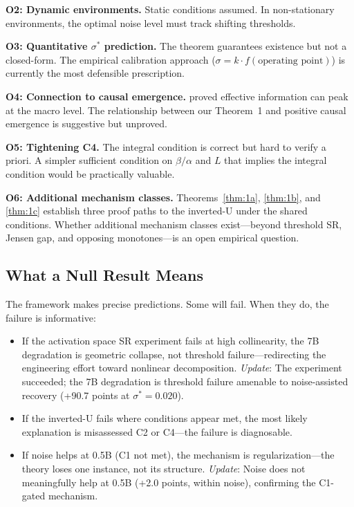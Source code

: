 \documentclass[12pt,letterpaper]{article}
\theoremstyle{definition}
\theoremstyle{remark}
\begin{document}
\textbf{O2: Dynamic environments.} Static conditions assumed. In non-stationary environments, the optimal noise level must track shifting thresholds.

\textbf{O3: Quantitative $\sigma^*$ prediction.} The theorem guarantees existence but not a closed-form. The empirical calibration approach ($\sigma = k \cdot f(\text{operating point})$) is currently the most defensible prescription.

\textbf{O4: Connection to causal emergence.} \citet{hoel2013} proved effective information can peak at the macro level. The relationship between our Theorem~1 and positive causal emergence is suggestive but unproved.

\textbf{O5: Tightening C4.} The integral condition is correct but hard to verify a priori. A simpler sufficient condition on $\beta/\alpha$ and $L$ that implies the integral condition would be practically valuable.

\textbf{O6: Additional mechanism classes.} Theorems~\ref{thm:1a}, \ref{thm:1b}, and \ref{thm:1c} establish three proof paths to the inverted-U under the shared conditions. Whether additional mechanism classes exist---beyond threshold SR, Jensen gap, and opposing monotones---is an open empirical question.


\subsection{What a Null Result Means}

The framework makes precise predictions. Some will fail. When they do, the failure is informative:
\begin{itemize}
    \item If the activation space SR experiment fails at high collinearity, the 7B degradation is geometric collapse, not threshold failure---redirecting the engineering effort toward nonlinear decomposition. \emph{Update}: The experiment succeeded; the 7B degradation is threshold failure amenable to noise-assisted recovery (+90.7 points at $\sigma^* = 0.020$).
    \item If the inverted-U fails where conditions appear met, the most likely explanation is misassessed C2 or C4---the failure is diagnosable.
    \item If noise helps at 0.5B (C1 not met), the mechanism is regularization---the theory loses one instance, not its structure. \emph{Update}: Noise does not meaningfully help at 0.5B (+2.0 points, within noise), confirming the C1-gated mechanism.
\end{itemize}
\end{document}
